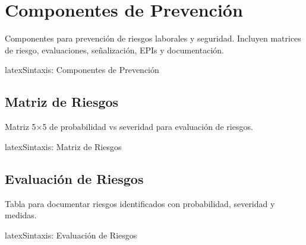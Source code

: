\section{Componentes de Prevención}
\label{sec:comp-prevencion}

Componentes para prevención de riesgos laborales y seguridad. Incluyen
matrices de riesgo, evaluaciones, señalización, EPIs y documentación.

\begin{codigosimple}{latex}{Sintaxis: Componentes de Prevención}
\usepackage[prevencion]{eps-componentes}
\end{codigosimple}

\subsection{Matriz de Riesgos}
\label{subsec:matriz-riesgos}

Matriz 5×5 de probabilidad vs severidad para evaluación de riesgos.

\begin{codigosimple}{latex}{Sintaxis: Matriz de Riesgos}
\begin{riskmatrixbox}[Título]
  \riskmatrix
\end{riskmatrixbox}
\end{codigosimple}

\begin{riskmatrixbox}
  \riskmatrix
\end{riskmatrixbox}

\subsection{Evaluación de Riesgos}
\label{subsec:evaluacion-riesgos}

Tabla para documentar riesgos identificados con probabilidad, severidad y medidas.

\begin{codigosimple}{latex}{Sintaxis: Evaluación de Riesgos}
\begin{riskassessment}
\end{riskassessment}
\end{codigosimple}

